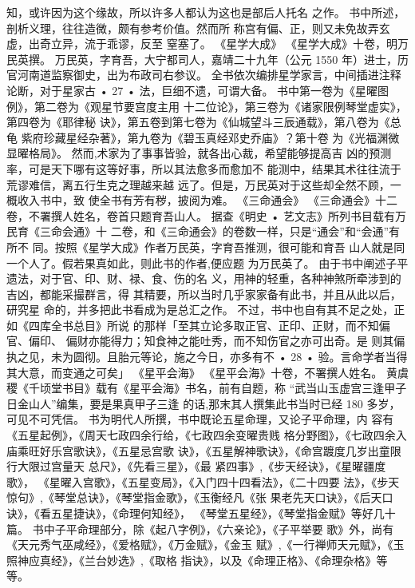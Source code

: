 知，或许因为这个缘故，所以许多人都认为这也是部后人托名
之作。
书中所述，剖析义理，往往造微，颇有参考价值。然而所
称宫有偏、正，则又未免故弄玄虚，出奇立异，流于乖谬，反至
窒塞了。
《星学大成》
《星学大成》十卷，明万民英撰。
万民英，字育吾，大宁都司人，嘉靖二十九年（公元 1550
年）进士，历官河南道监察御史，出为布政司右参议。
全书依次编排星学家言，中间插进注释论断，对于星家古
• 27 •
法，巨细不遗，可谓大备。
书中第一卷为《星曜图例》，第二卷为《观星节要宫度主用
十二位论》，第三卷为《诸家限例琴堂虚实》，第四卷为《耶律秘
诀》，第五卷到第七卷为《仙城望斗三辰通载》，第八卷为《总龟
紫府珍藏星经杂著》，第九卷为《碧玉真经邓史乔庙》？第十卷
为《光福渊微显曜格局》。
然而,术家为了事事皆验，就各出心裁，希望能够提高吉
凶的预测率，可是天下哪有这等好事，所以其法愈多而愈加不
能测中，结果其术往往流于荒谬难信，离五行生克之理越来越
远了。但是，万民英对于这些却全然不顾，一概收入书中，致
使全书有芳有秽，披阅为难。
《三命通会》
《三命通会》十二卷，不署撰人姓名，卷首只题育吾山人。
据查《明史 • 艺文志》所列书目载有万民育《三命会通》十
二卷，和《三命通会》的卷数一样，只是“通会”和“会通”有所不
同。按照《星学大成》作者万民英，字育吾推测，很可能和育吾
山人就是同一个人了。假若果真如此，则此书的作者,便应题
为万民英了。
由于书中阐述子平遗法，对于官、印、财、禄、食、伤的名
义，用神的轻重，各种神煞所牵涉到的吉凶，都能采撮群言，得
其精要，所以当时几乎家家备有此书，并且从此以后，研究星
命的，并多把此书看成为是总汇之作。
不过，书中也自有其不足之处，正如《四库全书总目》所说
的那样「至其立论多取正官、正印、正财，而不知偏官、偏印、
偏财亦能得力；知食神之能吐秀，而不知伤官之亦可出奇。是
则其偏执之见，未为圆彻。且胎元等论，施之今日，亦多有不
• 28 •
验。言命学者当得其大意，而变通之可矣」
《星平会海》
《星平会海》十卷，不署撰人姓名。
黄虞稷《千顷堂书目》载有《星平会海》书名，前有自题，称
“武当山玉虚宫三逢甲子日金山人”编集，要是果真甲子三逢
的话,那末其人撰集此书当时已经 180 多岁，可见不可凭信。
书为明代人所撰，书中既论五星命理，又论子平命理，内
容有《五星起例》，《周天七政四余行给，《七政四余变曜贵贱
格分野图》，《七政四余入庙乘旺好乐宫歌诀》，《五星忌宫歌
诀》，《五星解神歌诀》，《命宫踱度几岁出童限行大限过宫量天
总尺》，《先看三星》，《最 紧四事》,《步天经诀》，《星曜疆度歌》，
《星曜入宫歌》，《五星变局》，《入门四十四看法》，《二十四要
法》，《步天惊句》,《琴堂总诀》，《琴堂指金歌》，《玉衡经凡《张
果老先天口诀》，《后天口诀》，《看五星捷诀》，《命理何知经》，
《琴堂五星经》，《琴堂指金赋》等好几十篇。
书中子平命理部分，除《起八字例》，《六亲论》，《子平举要
歌》外，尚有《天元秀气巫咸经》，《爱格赋》，《万金赋》，《金玉
赋》,《一行禅师天元赋》，《玉照神应真经》，《兰台妙选》,《取格
指诀》，以及《命理正格》、《命理杂格》等等。
